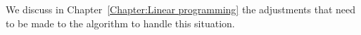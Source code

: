 We discuss in Chapter~\ref{Chapter:Linear programming} the adjustments that need to 
be made to the algorithm to handle this situation.

%
%
